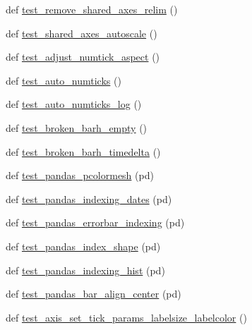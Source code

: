 \begin{DoxyCompactItemize}
\item 
def \hyperlink{namespacematplotlib_1_1tests_1_1test__axes_aef7f16be1c7a356e273affd3ce5c47db}{test\+\_\+remove\+\_\+shared\+\_\+axes\+\_\+relim} ()
\item 
def \hyperlink{namespacematplotlib_1_1tests_1_1test__axes_a8b2791d73fedd0f866093c26fdd08f1e}{test\+\_\+shared\+\_\+axes\+\_\+autoscale} ()
\item 
def \hyperlink{namespacematplotlib_1_1tests_1_1test__axes_a79928cde393b033f64a198fde99ccf69}{test\+\_\+adjust\+\_\+numtick\+\_\+aspect} ()
\item 
def \hyperlink{namespacematplotlib_1_1tests_1_1test__axes_a85dcd67fe87def3dc21bc0b5d02366a5}{test\+\_\+auto\+\_\+numticks} ()
\item 
def \hyperlink{namespacematplotlib_1_1tests_1_1test__axes_a0abd01b1595814146d6210c54259d8fe}{test\+\_\+auto\+\_\+numticks\+\_\+log} ()
\item 
def \hyperlink{namespacematplotlib_1_1tests_1_1test__axes_ac0bb33a94acada221f16faf8702e6b7f}{test\+\_\+broken\+\_\+barh\+\_\+empty} ()
\item 
def \hyperlink{namespacematplotlib_1_1tests_1_1test__axes_ac08390010afb90ec57f65a97ffd401de}{test\+\_\+broken\+\_\+barh\+\_\+timedelta} ()
\item 
def \hyperlink{namespacematplotlib_1_1tests_1_1test__axes_aa2699e04a92197417e95081f540a5829}{test\+\_\+pandas\+\_\+pcolormesh} (pd)
\item 
def \hyperlink{namespacematplotlib_1_1tests_1_1test__axes_aca96c7a0b7a916823b22ce6e60f627fa}{test\+\_\+pandas\+\_\+indexing\+\_\+dates} (pd)
\item 
def \hyperlink{namespacematplotlib_1_1tests_1_1test__axes_a41d9c44e62ae750deb81a90cb1b94747}{test\+\_\+pandas\+\_\+errorbar\+\_\+indexing} (pd)
\item 
def \hyperlink{namespacematplotlib_1_1tests_1_1test__axes_a2776f51d0a5a07d7f3289f77dff3d2b6}{test\+\_\+pandas\+\_\+index\+\_\+shape} (pd)
\item 
def \hyperlink{namespacematplotlib_1_1tests_1_1test__axes_af7e7f5149d2d056fcb0869761433a54f}{test\+\_\+pandas\+\_\+indexing\+\_\+hist} (pd)
\item 
def \hyperlink{namespacematplotlib_1_1tests_1_1test__axes_a66a1bf05f1ed31a34d8141b3bcfa70e7}{test\+\_\+pandas\+\_\+bar\+\_\+align\+\_\+center} (pd)
\item 
def \hyperlink{namespacematplotlib_1_1tests_1_1test__axes_a9eda1920ac94e4fe88e2aef45f405893}{test\+\_\+axis\+\_\+set\+\_\+tick\+\_\+params\+\_\+labelsize\+\_\+labelcolor} ()

\end{DoxyCompactItemize}

